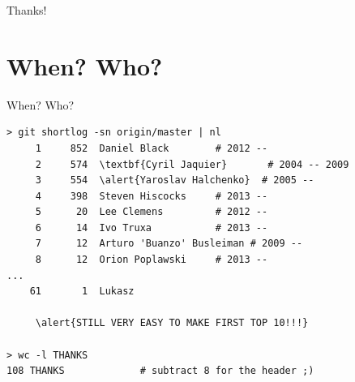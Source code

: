 \documentclass[]{beamer}
\begin{document}
\begin{frame}{}
\begin{center}
\Large Thanks!
\end{center}
\end{frame}

\appendix

\section{When? Who?}

\begin{frame}[fragile]{When? Who?}

\begin{Verbatim}[commandchars=\\\{\},fontsize=\small]
> git shortlog -sn origin/master | nl
     1	   852	Daniel Black        # 2012 --
     2	   574	\textbf{Cyril Jaquier}       # 2004 -- 2009
     3	   554	\alert{Yaroslav Halchenko}  # 2005 --
     4	   398	Steven Hiscocks     # 2013 --
     5	    20	Lee Clemens         # 2012 --
     6	    14	Ivo Truxa           # 2013 --
     7	    12	Arturo 'Buanzo' Busleiman # 2009 --
     8	    12	Orion Poplawski     # 2013 --
...
    61	     1	Lukasz

     \alert{STILL VERY EASY TO MAKE FIRST TOP 10!!!}

> wc -l THANKS
108 THANKS             # subtract 8 for the header ;)
\end{Verbatim}
\end{frame}
\end{document}
